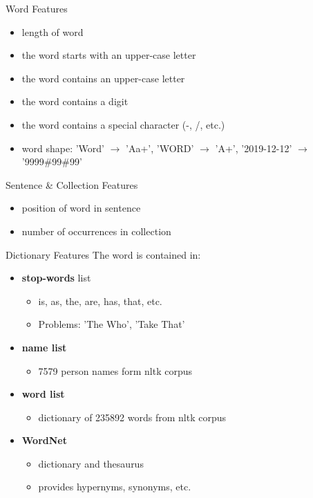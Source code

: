 \documentclass[12pt, tikz]{beamer}
\begin{document}
\begin{frame}[fragile]{Word Features}
	\begin{itemize}
		\item<1-> length of word
		\item<2-> the word starts with an upper-case letter
		\item<3-> the word contains an upper-case letter
		\item<4-> the word contains a digit
		\item<5-> the word contains a special character (-, /, etc.)
		\item<6-> word shape: 'Word' $\rightarrow$ 'Aa+', 'WORD' $\rightarrow$ 'A+', '2019-12-12' $\rightarrow$ '9999\#99\#99'
	\end{itemize}
\end{frame}

\begin{frame}[fragile]{Sentence \& Collection Features}
	\begin{itemize}
		\item<1-> position of word in sentence
		\item<2-> number of occurrences in collection
	\end{itemize}
\end{frame}

\begin{frame}[fragile]{Dictionary Features}
	The word is contained in:
	\begin{itemize}
		\item<1-> \textbf{stop-words} list
		\begin{itemize}
			\item is, as, the, are, has, that, etc.
			\item Problems: 'The Who', 'Take That'
		\end{itemize}
		\item<2-> \textbf{name list}
		\begin{itemize}
			\item 7579 person names form nltk corpus
		\end{itemize}
		\item<3-> \textbf{word list}
		\begin{itemize}
			\item dictionary of 235892 words from nltk corpus
		\end{itemize}
		\item<4-> \textbf{WordNet}
		\begin{itemize}
			\item dictionary and thesaurus
			\item provides hypernyms, synonyms, etc.
		\end{itemize}
	\end{itemize}
\end{frame}
\end{document}
